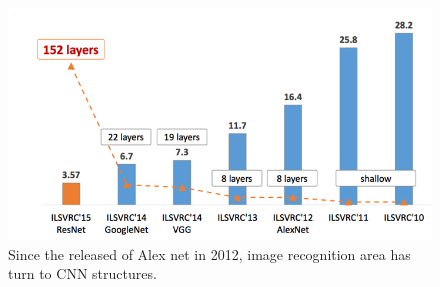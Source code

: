 \documentclass[senior]{IPSstyle}
\begin{document}
\begin{figure}
    \centering
    \includegraphics[width=15cm]{MasterThesis-master/images/cnnnetworks.png}
    \caption{Since the released of Alex net in 2012, image recognition area has turn to CNN structures.}
    \label{fig:imagenet}
\end{figure}
\end{document}
